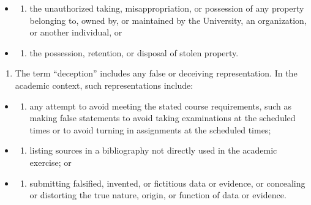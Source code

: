 \begin{itemize}
\item
  \begin{enumerate}
  \def\labelenumi{(\alph{enumi})}
  \tightlist
  \item
    the unauthorized taking, misappropriation, or possession of any property belonging to, owned by, or maintained by the University, an organization, or another individual, or
  \end{enumerate}
\item
  \begin{enumerate}
  \def\labelenumi{(\alph{enumi})}
  \setcounter{enumi}{1}
  \tightlist
  \item
    the possession, retention, or disposal of stolen property.
  \end{enumerate}
\end{itemize}

\begin{enumerate}
\def\labelenumi{\arabic{enumi}.}
\setcounter{enumi}{3}
\tightlist
\item
  The term ``deception'' includes any false or deceiving representation. In the academic context, such representations include:
\end{enumerate}

\begin{itemize}
\item
  \begin{enumerate}
  \def\labelenumi{(\alph{enumi})}
  \tightlist
  \item
    any attempt to avoid meeting the stated course requirements, such as making false statements to avoid taking examinations at the scheduled times or to avoid turning in assignments at the scheduled times;
  \end{enumerate}
\item
  \begin{enumerate}
  \def\labelenumi{(\alph{enumi})}
  \setcounter{enumi}{1}
  \tightlist
  \item
    listing sources in a bibliography not directly used in the academic exercise; or
  \end{enumerate}
\item
  \begin{enumerate}
  \def\labelenumi{(\alph{enumi})}
  \setcounter{enumi}{2}
  \tightlist
  \item
    submitting falsified, invented, or fictitious data or evidence, or concealing or distorting the true nature, origin, or function of data or evidence.
  \end{enumerate}
\end{itemize}

